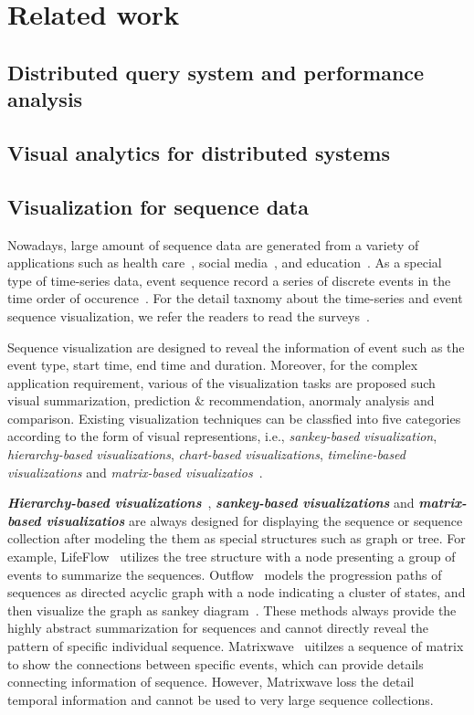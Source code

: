 \section{Related work}
\subsection{Distributed query system and performance analysis}
\subsection{Visual analytics for distributed systems}
\subsection{Visualization for sequence data}
Nowadays, large amount of sequence data are generated from a variety of applications such as health care~\cite{malik2015cohort, wongsuphasawat2011outflow}, social media~\cite{zhao2014fluxflow, law2018maqui}, and education~\cite{chen2015peakvizor, mu2019moocad, goulden2019ccvis, he2019vuc, chen2018viseq}.
As a special type of time-series data, event sequence record a series of discrete events in the time order of occurence~\cite{guo2020survey}. For the detail taxnomy about the time-series and event sequence visualization, we refer the readers to read the surveys~\cite{guo2020survey, silva2000visualization}. 

Sequence visualization are designed to reveal the information of event such as the event type, start time, end time and duration. Moreover, for the complex application requirement, various of the visualization tasks are proposed such visual summarization, prediction $\&$ recommendation, anormaly analysis and comparison. Existing visualization techniques can be classfied into five categories according to the form of visual representions, i.e., \emph{sankey-based visualization}, \emph{hierarchy-based visualizations}, \emph{chart-based visualizations}, \emph{timeline-based visualizations} and \emph{matrix-based visualizatios}~\cite{guo2020survey}. 

\emph{\textbf{Hierarchy-based visualizations}}~\cite{gotz2019visual}, \emph{\textbf{sankey-based visualizations}} and \emph{\textbf{matrix-based visualizatios}} are always designed for displaying the sequence or sequence collection after modeling the them as special structures such as graph or tree.
For example, LifeFlow~\cite{wongsuphasawat2011lifeflow} utilizes the tree structure with a node presenting a group of events to summarize the sequences. Outflow~\cite{wongsuphasawat2011outflow} models the progression paths of sequences as directed acyclic graph with a node indicating a cluster of states, and then visualize the graph as sankey diagram~\cite{riehmann2005interactive}.  These methods always provide the highly abstract summarization for sequences and cannot directly reveal the pattern of specific individual sequence. Matrixwave~\cite{zhao2015matrixwave} uitilzes a sequence of matrix to show the connections between specific events, which can provide details connecting information of sequence. However, Matrixwave loss the detail temporal information and cannot be used to very large sequence collections. 

